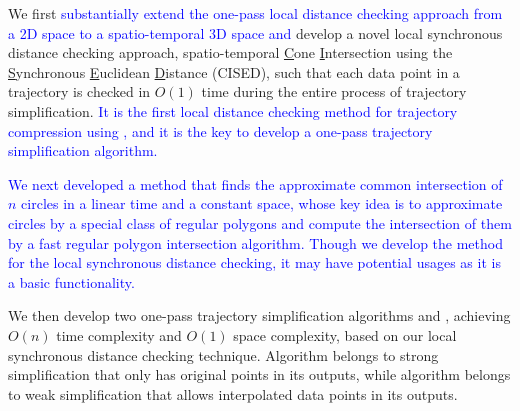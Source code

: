  We first \textcolor{blue}{substantially extend the one-pass local distance checking approach from a 2D space to a spatio-temporal 3D space and} develop a novel local synchronous distance checking approach, \ie spatio-temporal \underline{C}one \underline{I}ntersection using the \underline{S}ynchronous \underline{E}uclidean \underline{D}istance (CISED), such that each data point in a trajectory is checked in $O(1)$ time during the entire process of trajectory simplification.
\textcolor{blue}{It is the first local distance checking method for trajectory compression using \sed, and it is the key to develop a one-pass trajectory simplification algorithm.}



 \textcolor{blue}{We next developed a method that finds the approximate common intersection of $n$ circles in a linear time and a constant space, whose key idea is to approximate circles by a special class of regular polygons and compute the intersection of them by a fast regular polygon intersection algorithm. Though we develop the method for the local synchronous distance checking, it may have potential usages as it is a basic functionality.}



 We then develop two one-pass trajectory simplification algorithms \cist and \cista, achieving $O(n)$ time complexity and $O(1)$ space complexity, based on our local synchronous distance checking technique.
Algorithm \cist belongs to strong simplification that only has original points in its outputs, while algorithm \cista belongs to weak simplification that allows interpolated data points in its outputs.


